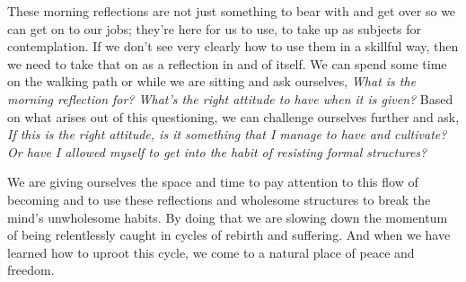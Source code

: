 These morning reflections are not just something to bear with and get 
over so we can get on to our jobs; they're here for us to use, to take 
up as subjects for contemplation. If we don't see very clearly how to 
use them in a skillful way, then we need to take that on as a 
reflection in and of itself. We can spend some time on the walking path 
or while we are sitting and ask ourselves, \emph{What is the morning 
reflection for? What's the right attitude to have when it is given?} 
Based on what arises out of this questioning, we can challenge 
ourselves further and ask, \emph{If this is the right attitude, is it 
something that I manage to have and cultivate? Or have I allowed myself 
to get into the habit of resisting formal structures?}

We are giving ourselves the space and time to pay attention to this 
flow of becoming and to use these reflections and wholesome structures 
to break the mind's unwholesome habits. By doing that we are slowing 
down the momentum of being relentlessly caught in cycles of rebirth and 
suffering. And when we have learned how to uproot this cycle, we come 
to a natural place of peace and freedom.

